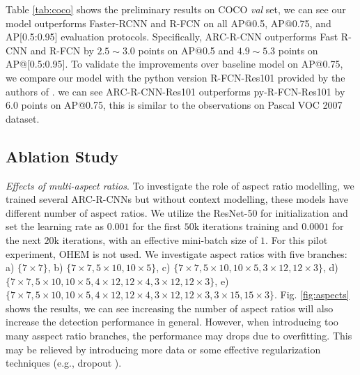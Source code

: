\documentclass[10pt,twocolumn,letterpaper]{article}
\begin{document}
\begin{table} 
\begin{center}
\end{center}
\caption{Preliminary detection results on MS COCO. $\dag$ \small{https://github.com/Orpine/py-R-FCN}}
\label{tab:coco} 
\vspace{-3mm}
\end{table}

Table \ref{tab:coco} shows the preliminary results on COCO \textit{val} set, we can see our model outperforms Faster-RCNN and R-FCN on all AP@0.5, AP@0.75, and AP[0.5:0.95] evaluation protocols.
Specifically, ARC-R-CNN outperforms Fast R-CNN and R-FCN by $2.5 \sim 3.0$ points on AP@0.5 and $4.9 \sim 5.3$ points on AP@[0.5:0.95].
To validate the improvements over baseline model on AP@0.75, we compare our model with the python version R-FCN-Res101 provided by the authors of \cite{rfcn}.
we can see ARC-R-CNN-Res101 outperforms py-R-FCN-Res101 by $6.0$ points on AP@0.75, this is similar to the observations on Pascal VOC 2007 dataset.

\vspace{-1mm}
\subsection{Ablation Study}
\vspace{-1mm}
\textit{Effects of multi-aspect ratios}.
To investigate the role of aspect ratio modelling, we trained several ARC-R-CNNs but without context modelling, these models have different number of aspect ratios. 
We utilize the ResNet-50 for initialization and set the learning rate as $0.001$ for the first $50$k iterations training and $0.0001$ for the next $20$k iterations, with an effective mini-batch size of $1$. For this pilot experiment, OHEM is not used.
We investigate aspect ratios with five branches: a) $\{7\times7\}$, b) $\{7\times7, 5\times10, 10\times5\}$, c) $\{7\times7, 5\times10, 10\times5, 3\times12, 12\times3\}$, d) $\{7\times7, 5\times10, 10\times5, 4\times12, 12\times4,3\times12, 12\times3\}$, e)$\{7\times7, 5\times10, 10\times5, 4\times12, 12\times4,3\times12, 12\times3, 3\times15, 15\times3\}$.
Fig. \ref{fig:aspects} shows the results, we can see increasing the number of aspect ratios will also increase the detection performance in general.
However, when introducing too many asspect ratio branches, the performance may drops due to overfitting. This may be relieved by introducing more data or some effective regularization techniques (e.g., dropout \cite{dropout}).
\end{document}

